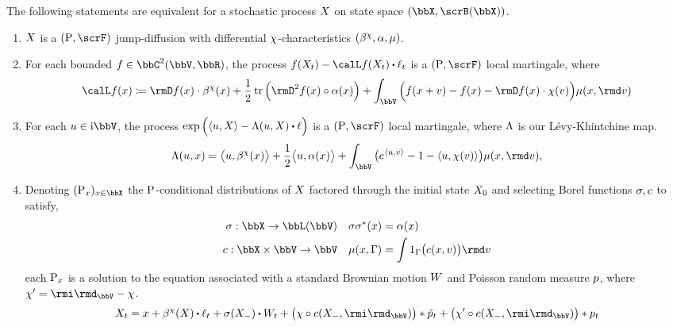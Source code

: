 \begin{theorem}
  \label{theorem:jump-diffusion-characterizations}
  The following statements are equivalent for a stochastic process $X$ on state space $(\stateSpace, \scrB(\stateSpace))$.
  \begin{enumerate}
    \item
      $X$ is a $(\Prb, \scrF)$ jump-diffusion with differential $\chi$-characteristics $(\beta^\chi, \alpha, \mu)$.
    \item
      For each bounded $f \in \ccpathSpace{2}{\vecSpace}{\bbR}$, the process $f(\X_t) - \generator f(\X_t) \shortInt \leb_t$ is a $(\Prb, \scrF)$ local martingale, where
      \[
        \generator f(\stateVar) \defeq \Der f(\stateVar) \cdot \affDrift^\trunc(\stateVar) + \frac12 \tr\Big( \Hess f(\stateVar) \circ \affDiff(\stateVar) \Big) + \int_\vecSpace \Big( f(\stateVar + \markVar) - f(\stateVar) - \Der f(\stateVar) \cdot \trunc(\markVar) \Big) \affJump(\stateVar, \rmd\markVar)
      \]
    \item
      For each $\momentVar \in \im\vecSpace$, the process $\exp\Big(\prj{\momentVar}{\X} - \ode(\momentVar, \X) \shortInt \leb \Big)$ is a $(\Prb, \scrF)$ local martingale, where $\Lambda$ is our L\'evy-Khintchine map.
      \[
        \ode(\momentVar, \stateVar) = \bprj{\momentVar}{\affDrift^\trunc(\stateVar)} + \frac12\bprj{\momentVar}{\affDiff(\stateVar)} + \int_\vecSpace \big( e^\prj{\momentVar}{\markVar} - 1 - \prj{\momentVar}{\trunc(\markVar)} \big) \affJump(\stateVar, \rmd\markVar),
      \]
    \item
      Denoting $(\Prb_\stateVar)_{\stateVar\in\stateSpace}$ the ${\operatorname{P}}$-conditional distributions of $X$ factored through the initial state $X_0$ and selecting Borel functions $\sigma, c$ to satisfy,
      \begin{equation*}
        \label{eq:sde-terms}
        \begin{aligned}
          \affDiffSqrt: \stateSpace \rightarrow \bbL(\vecSpace) && \affDiffSqrt\affDiffSqrt^*(\stateVar) &= \affDiff(\stateVar) \\
          \thinner: \stateSpace \times \vecSpace \rightarrow \vecSpace && \affJump(\stateVar, \Gamma) &= \int 1_\Gamma\big( \thinner(\stateVar, \markVar) \big) \rmd\markVar
        \end{aligned}
      \end{equation*}
      each ${\operatorname{P}}_x$ is a solution to the equation associated with a standard Brownian motion $W$ and Poisson random measure $p$, where $\trunc' = \id_\vecSpace - \trunc$.
      \begin{equation*}
        \X_t = \stateVar + \affDrift^\trunc(\X) \shortInt \leb_t + \sigma(\X_-) \shortInt \W_t + \big( \trunc \circ \thinner(\X_-, \id_\vecSpace) \big) \ast \compensate{\poisRM}_t + \big( \trunc' \circ \thinner(\X_-, \id_\vecSpace) \big) \ast \poisRM_t
      \end{equation*}
  \end{enumerate}
\end{theorem}
